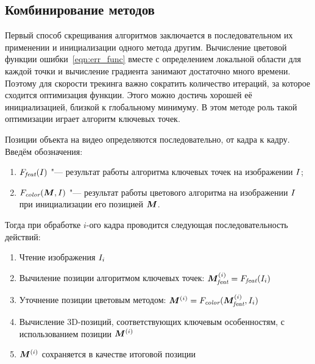 \subsection{Комбинирование методов}


Первый способ скрещивания алгоритмов заключается в последовательном их
применении и инициализации одного метода другим.
Вычисление цветовой функции ошибки~\ref{eqn:err_func} вместе с определением
локальной области для каждой точки и вычисление градиента занимают достаточно
много времени.
Поэтому для скорости трекинга важно сократить количество итераций, за которое
сходится оптимизация функции.
Этого можно достичь хорошей её инициализацией, близкой к глобальному
минимуму.
В этом методе роль такой оптимизации играет алгоритм ключевых точек.

\newcommand{\FeatAlg}{\ensuremath{F_{\text{\it feat}}}}
\newcommand{\ColorAlg}{\ensuremath{F_{\text {\it color}}}}
\newcommand{\PoseOnFrame}[1]{\ensuremath{\Pose^{\left( #1 \right)}}}
\newcommand{\PoseI}{\ensuremath{\PoseOnFrame{i}}}
\newcommand{\FeatPoseI}{\ensuremath{\PoseI_{\text {\it feat}}}}
\newcommand{\FeatPose}{\ensuremath{\Pose_{\text {\it feat}}}}

\newcommand{\XOld}{\ensuremath{\homv{x_{\text {\it old}}}}}
\newcommand{\XNew}{\ensuremath{\homv{x_{\text{\it new}}}}}
\newcommand{\ReprErr}[1]{\ensuremath{\homv{e}( #1 )}}

Позиции объекта на видео определяются последовательно, от кадра к кадру.
Введём обозначения:

\begin{enumerate}
\item $\FeatAlg(\Img)$ "--- результат работы алгоритма ключевых точек на
изображении $I$;
\item $\ColorAlg(\Pose, \Img)$ "--- результат работы цветового алгоритма на
изображении $I$
при инициализации его позицией $\bm{M}$.
\end{enumerate}

Тогда при обработке $i$-ого кадра проводится следующая последовательность
действий:

\begin{enumerate}
\item Чтение изображения $I_i$
\item Вычиление позиции алгоритмом ключевых точек:
    $\FeatPoseI = \FeatAlg(\Img_i)$
\item Уточнение позиции цветовым методом:
    $\PoseI = \ColorAlg(\FeatPoseI, \Img_i)$
\item Вычисление  3D-позиций, соответствующих ключевым особенностям, с
    использованием позиции $\PoseI$
\item $\PoseI$ сохраняется в качестве итоговой позиции
\end{enumerate}

